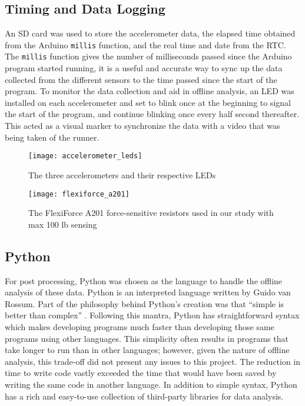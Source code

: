 \subsection{Timing and Data Logging}
An SD card was used to store the accelerometer data, the elapsed time obtained from the Arduino \texttt{millis} function, and the real time and date from the RTC.
The \texttt{millis} function gives the number of milliseconds passed since the Arduino program started running, it is a useful and accurate way to sync up the data collected from the different sensors to the time passed since the start of the program.
To monitor the data collection and aid in offline analysis, an LED was installed on each accelerometer and set to blink once at the beginning to signal the start of the program, and continue blinking once every half second thereafter.
This acted as a visual marker to synchronize the data with a video that was being taken of the runner.\par

\begin{figure}[h]
  \centering
  \texttt{[image: accelerometer\_leds]}
  \caption[Accelerometer LEDs]{The three accelerometers and their respective LEDs}
  \label{fig:x 3-leds}
\end{figure}


 \begin{figure}[h]
  \centering
  \texttt{[image: flexiforce\_a201]}
  \caption[FlexiForce A201]{The FlexiForce A201 force-sensitive resistors used in our study with max 100 lb sensing \parencite{tekscan-sensor}}
  \label{fig:x flexiforce}
\end{figure}

\subsection{Python}
For post processing, Python was chosen as the language to handle the offline analysis of these data.
Python is an interpreted language written by Guido van Rossum.
Part of the philosophy behind Python’s creation was that ``simple is better than complex'' \parencite[Peters, 1999, as cited in][p. 1]{psf}.
Following this mantra, Python has straightforward syntax which makes developing programs much faster than developing those same programs using other languages.
This simplicity often results in programs that take longer to run than in other languages; however, given the nature of offline analysis, this trade-off did not present any issues to this project.
The reduction in time to write code vastly exceeded the time that would have been saved by writing the same code in another language.
In addition to simple syntax, Python has a rich and easy-to-use collection of third-party libraries for data analysis.\par

